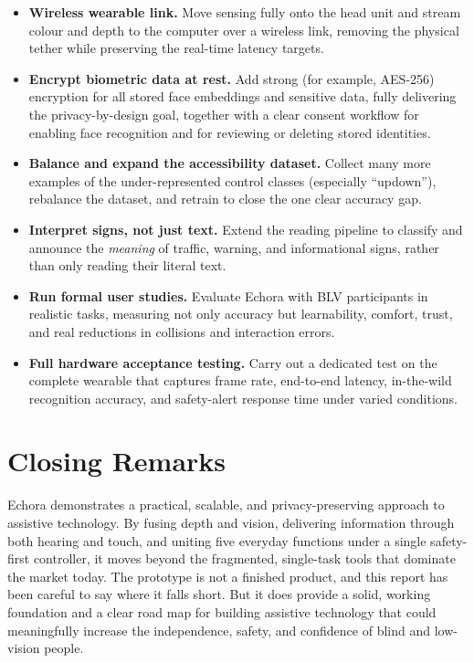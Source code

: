 \begin{itemize}
    \item \textbf{Wireless wearable link.} Move sensing fully onto the head unit and stream colour and depth to the computer over a wireless link, removing the physical tether while preserving the real-time latency targets.
    \item \textbf{Encrypt biometric data at rest.} Add strong (for example, AES-256) encryption for all stored face embeddings and sensitive data, fully delivering the privacy-by-design goal, together with a clear consent workflow for enabling face recognition and for reviewing or deleting stored identities.
    \item \textbf{Balance and expand the accessibility dataset.} Collect many more examples of the under-represented control classes (especially ``updown''), rebalance the dataset, and retrain to close the one clear accuracy gap.
    \item \textbf{Interpret signs, not just text.} Extend the reading pipeline to classify and announce the \emph{meaning} of traffic, warning, and informational signs, rather than only reading their literal text.
    \item \textbf{Run formal user studies.} Evaluate Echora with BLV participants in realistic tasks, measuring not only accuracy but learnability, comfort, trust, and real reductions in collisions and interaction errors.
    \item \textbf{Full hardware acceptance testing.} Carry out a dedicated test on the complete wearable that captures frame rate, end-to-end latency, in-the-wild recognition accuracy, and safety-alert response time under varied conditions.
\end{itemize}

\section{Closing Remarks}

Echora demonstrates a practical, scalable, and privacy-preserving approach to assistive technology. By fusing depth and vision, delivering information through both hearing and touch, and uniting five everyday functions under a single safety-first controller, it moves beyond the fragmented, single-task tools that dominate the market today. The prototype is not a finished product, and this report has been careful to say where it falls short. But it does provide a solid, working foundation and a clear road map for building assistive technology that could meaningfully increase the independence, safety, and confidence of blind and low-vision people.
